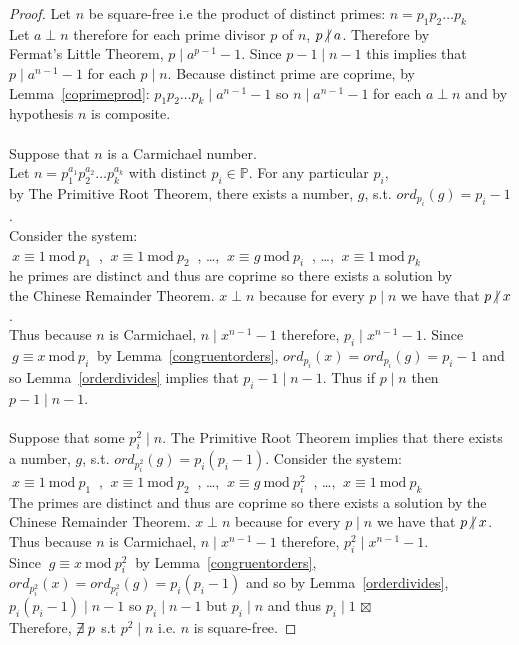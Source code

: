 \documentclass[12pt]{extarticle}
\newcommand{\cont}{$\boxtimes$}
\newcommand{\divides}{\mid}
\newcommand{\ndivides}{\centernot \mid}
\newcommand{\Primes}{\mathbb{P}}
\renewcommand{\mod}[3]{\: #1 \equiv #2 \: \mathrm{mod} \: #3 \:}
\begin{document}
\begin{proof}
Let $n$ be square-free i.e the product of distinct primes: $n = p_1   p_2   \dots   p_k$ \\ Let $a \perp n$ therefore for each prime divisor $p$ of $n$, $p \ndivides a$. Therefore by \\ Fermat's Little Theorem, $p \divides a^{p-1} - 1$. Since $p - 1 \divides n-1$ this implies that $p \divides a^{n-1} - 1$ for each $p \divides n$.
Because distinct prime are coprime, by Lemma~\ref{coprimeprod}: $p_1   p_2   \dots   p_k \divides a^{n-1} - 1$ so $n \divides a^{n-1} - 1$ for each $a \perp n$ and by hypothesis $n$ is composite.
\\\\
Suppose that $n$ is a Carmichael number. \\
Let $n = p_1^{a_1}   p_2^{a_2}   \dots   p_k^{a_k}$ with distinct $p_i \in \Primes$. For any particular $p_i$, \\
by The Primitive Root Theorem, there exists a number, $g$, s.t. $ord_{p_i}(g) = p_i-1$. \\ 
Consider the system: 
\\ \indent $\mod{x}{1}{p_1}$ , $\mod{x}{1}{p_2}$ , \dots ,  $\mod{x}{g}{p_i}$ , \dots , $\mod{x}{1}{p_k}$\\ he primes are distinct and thus are coprime so there exists a solution by \\ the Chinese Remainder Theorem. $x \perp n$ because for every $p \divides n$ we have that $p \ndivides x$. \\
Thus because $n$ is Carmichael, $n \divides x^{n-1} - 1$ therefore, $p_i \divides x^{n-1} - 1$. Since $\mod{g}{x}{p_i}$ by Lemma~\ref{congruentorders}, $ord_{p_i}(x) = ord_{p_i}(g) = p_i-1$ and so Lemma~\ref{orderdivides} implies that $p_i - 1 \divides n - 1$.
Thus if $p \divides n$ then $p-1 \divides n-1$. \\\\

\noindent Suppose that some $p_i^2 \divides n$. The Primitive Root Theorem implies that there exists a number, $g$, s.t. $ord_{p_i^2}(g) = p_i(p_i-1)$. Consider the system: \\ \indent $\mod{x}{1}{p_1}$ , $\mod{x}{1}{p_2}$ , \dots ,  $\mod{x}{g}{p_i^2}$ , \dots , $\mod{x}{1}{p_k}$\\ The primes are distinct and thus are coprime so there exists a solution by the Chinese Remainder Theorem. $x \perp n$ because for every $p \divides n$ we have that $p \ndivides x$. \\
Thus because $n$ is Carmichael, $n \divides x^{n-1} - 1$ therefore, $p_i^2 \divides x^{n-1} - 1$. \\ Since $\mod{g}{x}{p_i^2}$ by Lemma~\ref{congruentorders}, $ord_{p_i^2}(x) = ord_{p_i^2}(g) = p_i(p_i-1)$ and so by Lemma~\ref{orderdivides}, $p_i(p_i - 1) \divides n - 1$ so $p_i \divides n-1$ but $p_i \divides n$ and thus $p_i \divides 1$ \cont \\ Therefore, $\centernot \exists p$ s.t $p^2 \divides n$ i.e. $n$ is square-free. 
\end{proof}
\end{document}
